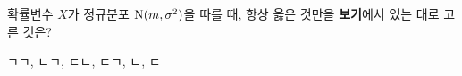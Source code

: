 확률변수 $X$가 정규분포 $\mathrm{N}(m{,}\mkern3mu\mathopen{}\sigma^2)$을 따를 때, 항상 옳은 것만을 \textbf{보기}에서 있는 대로 고른 것은?  
\begin{choices32}{ㄱ}{ㄱ, ㄴ}{ㄱ, ㄷ}{ㄴ, ㄷ}{ㄱ, ㄴ, ㄷ}\end{choices32}
